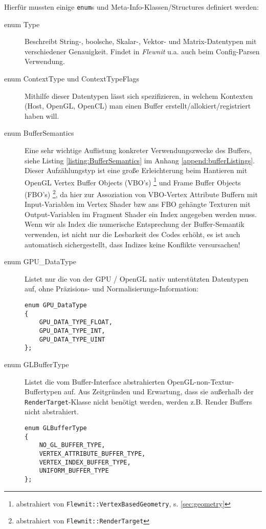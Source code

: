 	Hierfür mussten einige \lstinline|enum|s und Meta-Info-Klassen/Structures definiert werden:
	\begin{description}
		
		\item[enum Type] 
		Beschreibt String-, boolsche, Skalar-, Vektor- und Matrix-Datentypen mit verschiedener 
		Genauigkeit. Findet in \emph{Flewnit} u.a. auch beim Config-Parsen Verwendung.
		
		\item[enum ContextType und ContextTypeFlags] 
		Mithilfe dieser Datentypen lässt sich spezifizieren, in welchem 
		Kontexten (Host, OpenGL, OpenCL) man einen Buffer erstellt/allokiert/registriert haben will.
		
		\item[enum BufferSemantics] 
		\label{item:BufferSemantics}
		Eine sehr wichtige Auflistung konkreter Verwendungszwecke des Buffers,
		siehe Listing \ref{listing:BufferSemantics} im Anhang \ref{append:bufferListings}.
		Dieser Aufzählungstyp ist eine große Erleichterung beim Hantieren mit OpenGL Vertex Buffer Objects (VBO's) 
		\footnote{abstrahiert von \lstinline|Flewnit::VertexBasedGeometry|, s. \ref{sec:geometry} }
		und Frame Buffer Objects (FBO's) 
		\footnote{abstrahiert von \lstinline|Flewnit::RenderTarget|}, 
		da hier zur Assoziation von VBO-Vertex Attribute Buffern mit Input-Variablen im Vertex Shader
		bzw ans FBO gehängte Texturen mit Output-Variablen im Fragment Shader
		ein Index angegeben werden muss. 
		Wenn wir als Index die numerische Entsprechung der Buffer-Semantik verwenden, 
		ist nicht nur die Lesbarkeit des Codes erhöht, es ist auch automatisch sichergestellt, 
		dass Indizes keine Konflikte versursachen!
		
		\item[enum GPU\_DataType] Listet nur die von der GPU / OpenGL nativ unterstützten Datentypen auf, ohne
		Präzisions- und Normalisierungs-Information:
		\begin{lstlisting}		
enum GPU_DataType
{
	GPU_DATA_TYPE_FLOAT,
	GPU_DATA_TYPE_INT,
	GPU_DATA_TYPE_UINT
};
		\end{lstlisting}
		
		\item[enum GLBufferType]
		Listet die vom Buffer-Interface abstrahierten OpenGL-non-Textur-Buffertypen auf. 
		Aus Zeitgründen und Erwartung, dass sie außerhalb der \lstinline|RenderTarget|-Klasse nicht benötigt werden,
		werden z.B. Render Buffers nicht abstrahiert.
		\begin{lstlisting}		
enum GLBufferType
{
	NO_GL_BUFFER_TYPE,
	VERTEX_ATTRIBUTE_BUFFER_TYPE,
	VERTEX_INDEX_BUFFER_TYPE,
	UNIFORM_BUFFER_TYPE 
};
		\end{lstlisting}	
	

\end{description}

